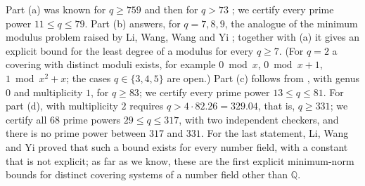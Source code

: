 Part (a) was known for $q\ge759$ \cite{LWWY2025} and then for $q>73$ \cite[Theorem~1.3]{BWang2026}; we certify every
prime power $11\le q\le79$. Part (b) answers, for $q=7,8,9$, the analogue of the minimum modulus problem raised by Li,
Wang, Wang and Yi \cite{LWWY2024}; together with (a) it gives an explicit bound for the least degree of a modulus for
every $q\ge7$. (For $q=2$ a covering with distinct moduli exists, for example $0\bmod x$, $0\bmod x+1$,
$1\bmod x^2+x$; the cases $q\in\{3,4,5\}$ are open.) Part (c) follows from \cite[Theorem~1.1]{BWang2026}, with genus
$0$ and multiplicity $1$, for $q\ge83$; we certify every prime power $13\le q\le81$. For part (d),
\cite[Theorem~1.1]{BWang2026} with multiplicity $2$ requires $q>4\cdot82.26=329.04$, that is, $q\ge331$; we certify all
$68$ prime powers $29\le q\le317$, with two independent checkers, and there is no prime power between $317$ and $331$.
For the last statement, Li, Wang and Yi \cite{LiWangYi2026} proved that such a bound exists for every number field,
with a constant that is not explicit; as far as we know, these are the first explicit minimum-norm bounds for distinct
covering systems of a number field other than $\mathbb{Q}$.

